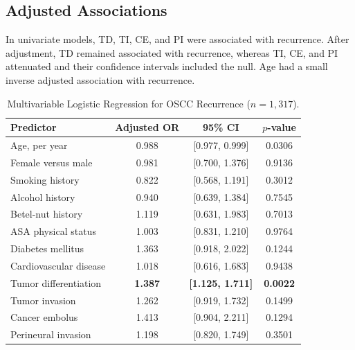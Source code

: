 \documentclass[11pt,a4paper]{article}
\begin{document}
\subsection{Adjusted Associations}

In univariate models, TD, TI, CE, and PI were associated with recurrence. After adjustment, TD remained associated with recurrence, whereas TI, CE, and PI attenuated and their confidence intervals included the null. Age had a small inverse adjusted association with recurrence.

\begin{table}[htbp]

\centering

\small

\caption{Multivariable Logistic Regression for OSCC Recurrence ($n=1,317$).}

\label{tab:mlr}

\begin{tabular*}{\linewidth}{@{\extracolsep{\fill}}lccc@{}}

\toprule

\textbf{Predictor} & \textbf{Adjusted OR} & \textbf{95\% CI} & \textbf{$p$-value} \\

\midrule

Age, per year & 0.988 & [0.977, 0.999] & 0.0306 \\

Female versus male & 0.981 & [0.700, 1.376] & 0.9136 \\

Smoking history & 0.822 & [0.568, 1.191] & 0.3012 \\

Alcohol history & 0.940 & [0.639, 1.384] & 0.7545 \\

Betel-nut history & 1.119 & [0.631, 1.983] & 0.7013 \\

ASA physical status & 1.003 & [0.831, 1.210] & 0.9764 \\

Diabetes mellitus & 1.363 & [0.918, 2.022] & 0.1244 \\

Cardiovascular disease & 1.018 & [0.616, 1.683] & 0.9438 \\

Tumor differentiation & \textbf{1.387} & \textbf{[1.125, 1.711]} & \textbf{0.0022} \\

Tumor invasion & 1.262 & [0.919, 1.732] & 0.1499 \\

Cancer embolus & 1.413 & [0.904, 2.211] & 0.1294 \\

Perineural invasion & 1.198 & [0.820, 1.749] & 0.3501 \\

\bottomrule

\end{tabular*}

\end{table}
\end{document}
